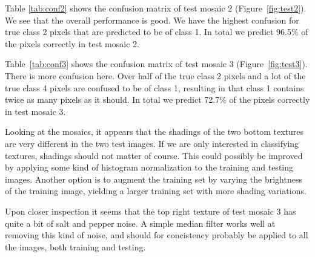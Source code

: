 \documentclass[a4paper]{article}
\begin{document}
Table \ref{tab:conf2} shows the confusion matrix of test mosaic 2
(Figure~\ref{fig:test2}). We see that the overall performance is good.
We have the highest confusion for true class 2 pixels that are predicted
to be of class 1. In total we predict 96.5\% of the pixels correctly in
test mosaic 2.

Table~\ref{tab:conf3} shows the confusion matrix of test mosaic 3
(Figure~\ref{fig:test3}). There is more confusion here. Over half of the
true class 2 pixels and a lot of the true class 4 pixels are confused
to be of class 1, resulting in that class 1 contains twice as many
pixels as it should. In total we predict 72.7\% of the pixels correctly
in test mosaic 3.

Looking at the mosaics, it appears that the shadings of the two bottom
textures are very different in the two test images. If we are only
interested in classifying textures, shadings should not matter of
course. This could possibly be improved by applying some kind of
histogram normalization to the training and testing images. Another
option is to augment the training set by varying the brightness of the
training image, yielding a larger training set with more shading
variations.

Upon closer inspection it seems that the top right texture of test
mosaic 3 has quite a bit of salt and pepper noise. A simple median
filter works well at removing this kind of noise, and should for
concistency probably be applied to all the images, both training and
testing.
\end{document}
